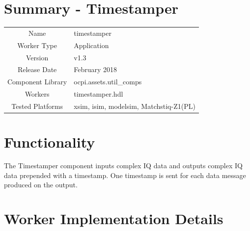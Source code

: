 \documentclass{article}
\author{} %
\date{Version \docVersion} %
\title{\docTitle}
\def\docVersion{1.3}
\def\comp{timestamper}
\def\Comp{Timestamper}
\begin{document}
\section*{Summary - \Comp}
\begin{tabular}{|c|M{13.5cm}|}
	\hline
	                  &                        \\
	\hline
	Name              & \comp                  \\
	\hline
	Worker Type       & Application            \\
	\hline
	Version           & v\docVersion \\
	\hline
	Release Date      & February 2018 \\
	\hline
	Component Library & ocpi.assets.util\_comps \\
	\hline
	Workers           & \comp.hdl              \\
	\hline
	Tested Platforms  & xsim, isim, modelsim, Matchstiq-Z1(PL) \\
	\hline
\end{tabular}

\section*{Functionality}
\begin{flushleft}
	The Timestamper component inputs complex IQ data and outputs complex IQ data prepended with a timestamp. One timestamp is sent for each data message produced on the output.
\end{flushleft}

\section*{Worker Implementation Details}
\end{document}
